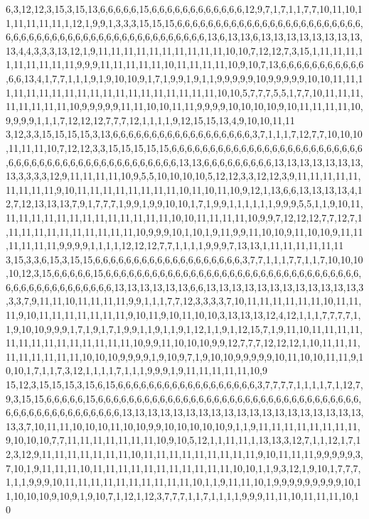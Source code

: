 6,3,12,12,3,15,3,15,13,6,6,6,6,6,15,6,6,6,6,6,6,6,6,6,6,6,6,12,9,7,1,7,1,1,7,7,10,11,10,11,11,11,11,11,1,12,1,9,9,1,3,3,3,15,15,15,6,6,6,6,6,6,6,6,6,6,6,6,6,6,6,6,6,6,6,6,6,6,6,6,6,6,6,6,6,6,6,6,6,6,6,6,6,6,6,6,6,6,6,6,6,6,6,6,6,6,13,6,13,13,6,13,13,13,13,13,13,13,13,13,4,4,3,3,3,13,12,1,9,11,11,11,11,11,11,11,11,11,11,10,10,7,12,12,7,3,15,1,11,11,11,11,11,11,11,11,11,9,9,9,11,11,11,11,11,10,11,11,11,11,10,9,10,7,13,6,6,6,6,6,6,6,6,6,6,6,6,6,13,4,1,7,7,1,1,1,9,1,9,10,10,9,1,7,1,9,9,1,9,1,1,9,9,9,9,9,10,9,9,9,9,9,10,10,11,11,11,11,11,11,11,11,11,11,11,11,11,11,11,11,11,11,11,10,10,5,7,7,7,5,5,1,7,7,10,11,11,11,11,11,11,11,11,10,9,9,9,9,9,11,11,10,10,11,11,9,9,9,9,10,10,10,10,9,10,11,11,11,11,10,9,9,9,9,1,1,1,7,12,12,12,7,7,7,12,1,1,1,1,9,12,15,15,13,4,9,10,10,11,11
3,12,3,3,15,15,15,15,3,13,6,6,6,6,6,6,6,6,6,6,6,6,6,6,6,6,6,6,3,7,1,1,1,7,12,7,7,10,10,10,11,11,11,10,7,12,12,3,3,15,15,15,15,15,6,6,6,6,6,6,6,6,6,6,6,6,6,6,6,6,6,6,6,6,6,6,6,6,6,6,6,6,6,6,6,6,6,6,6,6,6,6,6,6,6,6,6,6,6,6,6,13,13,6,6,6,6,6,6,6,6,6,13,13,13,13,13,13,13,13,3,3,3,3,12,9,11,11,11,11,10,9,5,5,10,10,10,10,5,12,12,3,3,12,12,3,9,11,11,11,11,11,11,11,11,11,9,10,11,11,11,11,11,11,11,11,10,11,10,11,10,9,12,1,13,6,6,13,13,13,13,4,12,7,12,13,13,13,7,9,1,7,7,7,1,9,9,1,9,9,10,10,1,7,1,9,9,1,1,1,1,1,1,9,9,9,5,5,1,1,9,10,11,11,11,11,11,11,11,11,11,11,11,11,11,11,10,10,11,11,11,11,10,9,9,7,12,12,12,7,7,12,7,1,11,11,11,11,11,11,11,11,11,11,10,9,9,9,10,1,10,1,9,11,9,9,11,10,10,9,11,10,10,9,11,11,11,11,11,11,9,9,9,9,1,1,1,1,12,12,12,7,7,1,1,1,1,9,9,9,7,13,13,1,11,11,11,11,11,11
3,15,3,3,6,15,3,15,15,6,6,6,6,6,6,6,6,6,6,6,6,6,6,6,6,6,6,6,3,7,7,1,1,1,7,7,1,1,7,10,10,10,10,12,3,15,6,6,6,6,6,15,6,6,6,6,6,6,6,6,6,6,6,6,6,6,6,6,6,6,6,6,6,6,6,6,6,6,6,6,6,6,6,6,6,6,6,6,6,6,6,6,6,6,6,6,6,6,6,13,13,13,13,13,13,6,6,13,13,13,13,13,13,13,13,13,13,13,13,3,3,3,7,9,11,11,10,11,11,11,11,9,9,1,1,1,7,7,12,3,3,3,3,7,10,11,11,11,11,11,11,10,11,11,11,9,10,11,11,11,11,11,11,11,9,10,11,9,10,11,10,10,3,13,13,13,12,4,12,1,1,1,7,7,7,7,1,1,9,10,10,9,9,9,1,7,1,9,1,7,1,9,9,1,1,9,1,1,9,1,12,1,1,9,1,12,15,7,1,9,11,10,11,11,11,11,11,11,11,11,11,11,11,11,11,11,10,9,9,11,10,10,10,9,9,12,7,7,7,12,12,12,1,10,11,11,11,11,11,11,11,11,11,10,10,10,9,9,9,9,1,9,10,9,7,1,9,10,10,9,9,9,9,9,10,11,10,10,11,11,9,10,10,1,7,1,1,7,3,12,1,1,1,1,7,1,1,1,9,9,9,1,9,11,11,11,11,11,10,9
15,12,3,15,15,15,3,15,6,15,6,6,6,6,6,6,6,6,6,6,6,6,6,6,6,6,6,6,3,7,7,7,7,1,1,1,1,7,1,12,7,9,3,15,15,6,6,6,6,6,15,6,6,6,6,6,6,6,6,6,6,6,6,6,6,6,6,6,6,6,6,6,6,6,6,6,6,6,6,6,6,6,6,6,6,6,6,6,6,6,6,6,6,6,6,6,6,6,6,6,13,13,13,13,13,13,13,13,13,13,13,13,13,13,13,13,13,13,13,13,3,7,10,11,11,10,10,10,11,10,10,9,9,10,10,10,10,10,9,1,1,9,11,11,11,11,11,11,11,11,9,10,10,10,7,7,11,11,11,11,11,11,11,10,9,10,5,12,1,1,11,11,1,13,13,3,12,7,1,1,12,1,7,12,3,12,9,11,11,11,11,11,11,11,10,11,11,11,11,11,11,11,11,11,9,10,11,11,11,9,9,9,9,9,3,7,10,1,9,11,11,11,10,11,11,11,11,11,11,11,11,11,11,11,10,10,1,1,9,3,12,1,9,10,1,7,7,7,1,1,1,9,9,9,10,11,11,11,11,11,11,11,11,11,11,10,1,1,9,11,11,10,1,9,9,9,9,9,9,9,9,9,10,11,10,10,10,9,10,9,1,9,10,7,1,12,1,12,3,7,7,7,1,1,7,1,1,1,1,9,9,9,11,11,10,11,11,11,10,10
